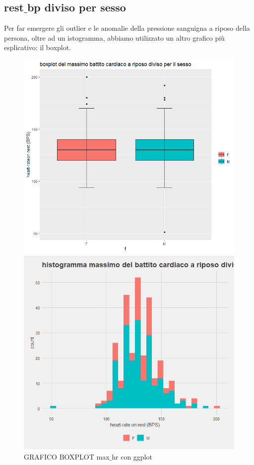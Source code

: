 \documentclass{article}
\begin{document}
\pagebreak

\subsection { rest$\_$bp diviso per sesso }
Per far emergere gli outlier e le anomalie della pressione sanguigna a riposo della persona, oltre ad un istogramma, abbiamo utilizzato un altro grafico più esplicativo: il boxplot.



\begin{figure}[!htb]
   \begin{minipage}{0.475\textwidth}
     \centering
     \includegraphics[width=1\linewidth]{rest_bp-boxplot before}
     \caption{GRAFICO BOXPLOT max$\_$hr con ggplot}
     \label{Fig:ds1}
   \end{minipage}\hfill
   \begin{minipage}{0.475\textwidth}
     \centering
     \includegraphics[width=1\linewidth]{rest_bp-hist before}

\end{minipage}
\end{figure}
\end{document}
